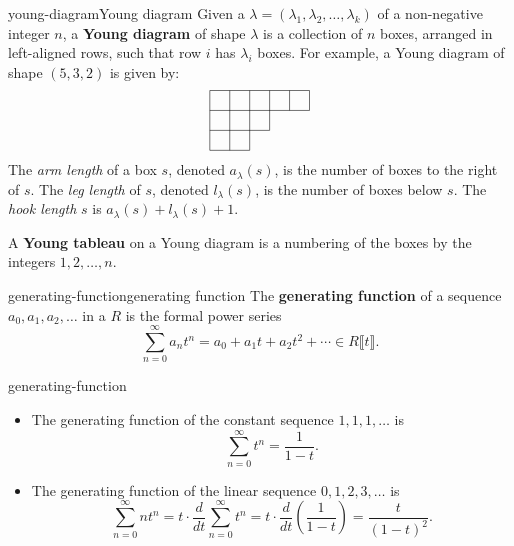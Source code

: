 \begin{topic}{young-diagram}{Young diagram}
    Given a  $\lambda = (\lambda_1, \lambda_2, \ldots, \lambda_k)$ of a non-negative integer $n$, a \textbf{Young diagram} of shape $\lambda$ is a collection of $n$ boxes, arranged in left-aligned rows, such that row $i$ has $\lambda_i$ boxes. For example, a Young diagram of shape $(5, 3, 2)$ is given by:
    \[ \begin{tikzpicture}
        \begin{scope}[scale=0.5]
            \draw (0, 3) -- (5, 3); \draw (0, 2) -- (5, 2); \draw (0, 1) -- (3, 1); \draw (0, 0) -- (2, 0); \draw (0, 3) -- (0, 0); \draw (1, 3) -- (1, 0); \draw (2, 3) -- (2, 0); \draw (3, 3) -- (3, 1); \draw (4, 3) -- (4, 2); \draw (5, 3) -- (5, 2);
        \end{scope}
    \end{tikzpicture} \]
    The \textit{arm length} of a box $s$, denoted $a_\lambda(s)$, is the number of boxes to the right of $s$. The \textit{leg length} of $s$, denoted $l_\lambda(s)$, is the number of boxes below $s$. The \textit{hook length} $s$ is $a_\lambda(s) + l_\lambda(s) + 1$.
    
    A \textbf{Young tableau} on a Young diagram is a numbering of the boxes by the integers $1, 2, \ldots, n$.
\end{topic}

\begin{topic}{generating-function}{generating function}
    The \textbf{generating function} of a sequence $a_0, a_1, a_2, \ldots$ in a  $R$ is the formal power series
    \[ \sum_{n = 0}^{\infty} a_n t^n = a_0 + a_1 t + a_2 t^2 + \cdots \in R \llbracket t \rrbracket . \]
\end{topic}

\begin{example}{generating-function}
    \begin{itemize}
        \item The generating function of the constant sequence $1, 1, 1, \ldots$ is
        \[ \sum_{n = 0}^{\infty} t^n = \frac{1}{1 - t} . \]
        \item The generating function of the linear sequence $0, 1, 2, 3, \ldots$ is
        \[ \sum_{n = 0}^{\infty} n t^{n} = t \cdot \frac{d}{dt} \sum_{n = 0}^{\infty} t^{n} = t \cdot \frac{d}{dt} \left( \frac{1}{1 - t} \right) = \frac{t}{(1 - t)^2} . \]
    \end{itemize}
\end{example}

